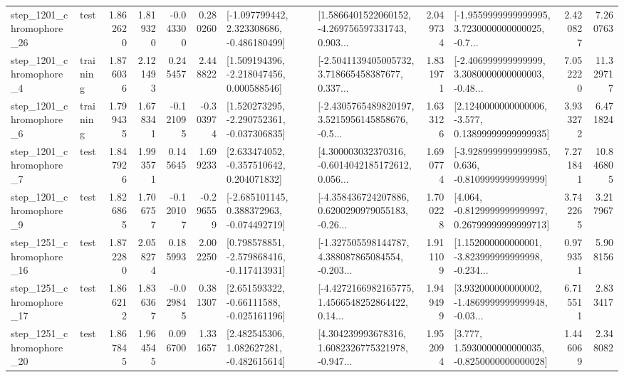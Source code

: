 \begin{tabular}{llrrrrllrlrr}
 step\_1201\_chromophore\_26 &      test &      1.862620 &    1.819320 &     -0.043300 &  0.280260 &   [-1.097799442, 2.323308686, -0.486180499] &  [1.5866401522060152, -4.269756597331743, 0.903... &       2.049734 &  [-1.9559999999999995, 3.7230000000000025, -0.7... &            2.420827 &          7.260763 \\
  step\_1201\_chromophore\_4 &  training &      1.876036 &    2.121493 &      0.245457 &  2.448822 &    [1.509194396, -2.218047456, 0.000588546] &  [-2.5041139405005732, 3.718665458387677, 0.337... &       1.831971 &  [-2.406999999999999, 3.3080000000000003, -0.48... &            7.052220 &         11.329717 \\
  step\_1201\_chromophore\_6 &  training &      1.799435 &    1.678341 &     -0.121095 & -0.303974 &   [1.520273295, -2.290752361, -0.037306835] &  [-2.4305765489820197, 3.5215956145858676, -0.5... &       1.633126 &  [2.1240000000000006, -3.577, 0.13899999999999935] &            3.933272 &          6.471824 \\
  step\_1201\_chromophore\_7 &      test &      1.847926 &    1.993571 &      0.145645 &  1.699233 &    [2.633474052, -0.357510642, 0.204071832] &  [4.300003032370316, -0.6014042185172612, 0.056... &       1.690774 &  [-3.9289999999999985, 0.636, -0.8109999999999999] &            7.271841 &         10.846805 \\
  step\_1201\_chromophore\_9 &      test &      1.826865 &    1.706757 &     -0.120107 & -0.296559 &   [-2.685101145, 0.388372963, -0.074492719] &  [-4.358436724207886, 0.6200290979055183, -0.26... &       1.700228 &  [4.064, -0.8129999999999997, 0.26799999999999713] &            3.742265 &          3.217967 \\
 step\_1251\_chromophore\_16 &      test &      1.872280 &    2.058274 &      0.185993 &  2.002250 &   [0.798578851, -2.579868416, -0.117413931] &  [-1.327505598144787, 4.388087865084554, -0.203... &       1.911109 &  [1.152000000000001, -3.823999999999998, -0.234... &            0.979351 &          5.908156 \\
 step\_1251\_chromophore\_17 &      test &      1.866212 &    1.836367 &     -0.029845 &  0.381307 &    [2.651593322, -0.66111588, -0.025161196] &  [-4.4272166982165775, 1.4566548252864422, 0.14... &       1.949499 &  [3.932000000000002, -1.4869999999999948, -0.03... &            6.715511 &          2.833417 \\
 step\_1251\_chromophore\_20 &      test &      1.867845 &    1.964545 &      0.096700 &  1.331657 &    [2.482545306, 1.082627281, -0.482615614] &  [4.304239993678316, 1.6082326775321978, -0.947... &       1.952094 &   [3.777, 1.5930000000000035, -0.8250000000000028] &            1.446069 &          2.348082 \\

\end{tabular}
